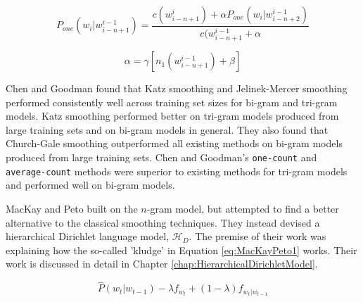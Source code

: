 
\begin{equation}
P_{one}(w_{i}|w_{i-n+1}^{i-1})=\frac{c(w_{i-n+1}^{i})+\alpha P_{one}(w_{i}|w_{i-n+2}^{i-1})}{c(w_{i-n+1}^{i-1}+\alpha}
\label{eq:chenGoodmanMacKayPeto}
\end{equation}

\begin{equation}
\alpha=\gamma[n_{1}(w_{i-n+1}^{i-1})+\beta]
\label{eq:chenGoodman4}
\end{equation}

Chen and Goodman found that Katz smoothing and Jelinek-Mercer smoothing performed consistently well across training set sizes for bi-gram and tri-gram models. Katz smoothing performed better on tri-gram models produced from large training sets and on bi-gram models in general. They also found that Church-Gale smoothing outperformed all existing methods on bi-gram models produced from large training sets. Chen and Goodman's \lstinline!one-count! and \lstinline!average-count! methods were superior to existing methods for tri-gram models and performed well on bi-gram models.


MacKay and Peto \cite{mackay1995hierarchical} built on the $n$-gram model, but attempted to find a better alternative to the classical smoothing techniques. They instead devised a hierarchical Dirichlet language model, $\mathscr{H}_{D}$. The premise of their work was explaining how the so-called 'kludge' in Equation \ref{eq:MacKayPeto1} works. Their work is discussed in detail in Chapter \ref{chap:HierarchicalDirichletModel}.


\begin{equation}
\hat{P}(w_{t}|w_{t-1})-\lambda f_{w_{t}}+(1-\lambda)f_{w_{t}|w_{t-1}}
\label{eq:MacKayPeto1}
\end{equation}

